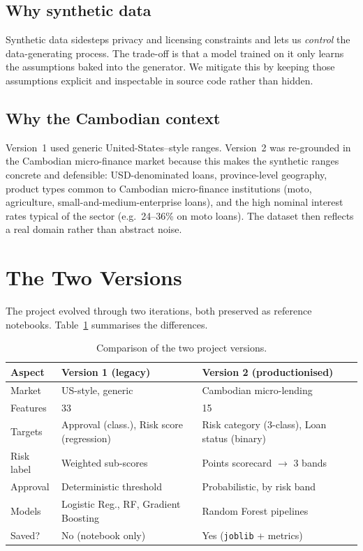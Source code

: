 \documentclass[conference]{IEEEtran}
\begin{document}
\subsection{Why synthetic data}
Synthetic data sidesteps privacy and licensing constraints and lets us
\emph{control} the data-generating process. The trade-off is that a model
trained on it only learns the assumptions baked into the generator. We mitigate
this by keeping those assumptions explicit and inspectable in source code rather
than hidden.

\subsection{Why the Cambodian context}
Version~1 used generic United-States--style ranges. Version~2 was re-grounded in
the Cambodian micro-finance market because this makes the synthetic ranges
concrete and defensible: USD-denominated loans, province-level geography,
product types common to Cambodian micro-finance institutions (moto, agriculture,
small-and-medium-enterprise loans), and the high nominal interest rates typical
of the sector (e.g.\ 24--36\% on moto loans). The dataset then reflects a real
domain rather than abstract noise.

\section{The Two Versions}

The project evolved through two iterations, both preserved as reference
notebooks. Table~\ref{tab:versions} summarises the differences.

\begin{table}[t]
\caption{Comparison of the two project versions.}
\label{tab:versions}
\centering
\renewcommand{\arraystretch}{1.25}
\begin{tabular}{p{1.5cm}p{2.6cm}p{2.6cm}}
\toprule
\textbf{Aspect} & \textbf{Version 1 (legacy)} & \textbf{Version 2 (productionised)} \\
\midrule
Market   & US-style, generic & Cambodian micro-lending \\
Features & 33 & 15 \\
Targets  & Approval (class.), Risk score (regression) & Risk category (3-class), Loan status (binary) \\
Risk label & Weighted sub-scores & Points scorecard $\to$ 3 bands \\
Approval & Deterministic threshold & Probabilistic, by risk band \\
Models   & Logistic Reg., RF, Gradient Boosting & Random Forest pipelines \\
Saved?   & No (notebook only) & Yes (\texttt{joblib} + metrics) \\
\bottomrule
\end{tabular}
\end{table}
\end{document}
